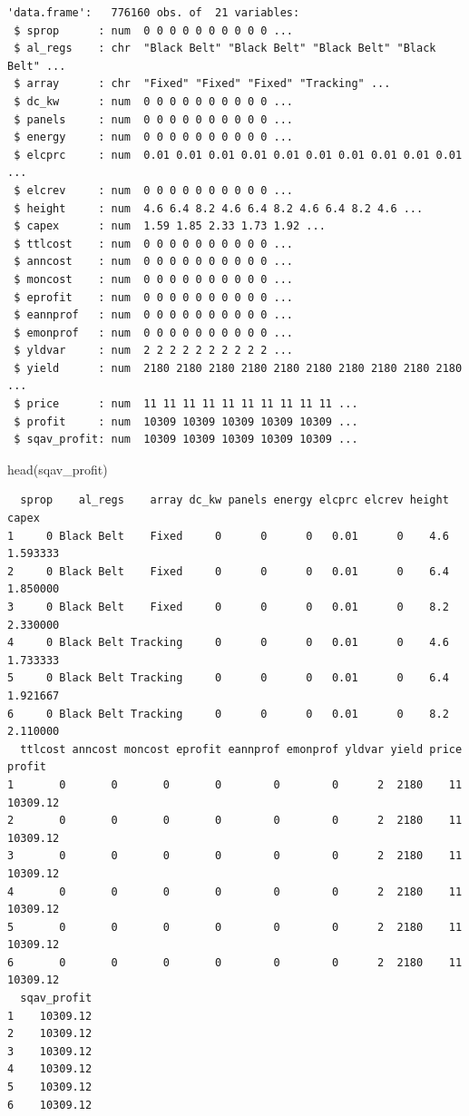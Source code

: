 \documentclass[
  letterpaper,
  DIV=11,
  numbers=noendperiod]{scrartcl}
\newenvironment{Shaded}{\begin{snugshade}}{\end{snugshade}}
\newcommand{\FunctionTok}[1]{\textcolor[rgb]{0.28,0.35,0.67}{#1}}
\newcommand{\NormalTok}[1]{\textcolor[rgb]{0.00,0.23,0.31}{#1}}
\begin{document}
\begin{verbatim}
'data.frame':   776160 obs. of  21 variables:
 $ sprop      : num  0 0 0 0 0 0 0 0 0 0 ...
 $ al_regs    : chr  "Black Belt" "Black Belt" "Black Belt" "Black Belt" ...
 $ array      : chr  "Fixed" "Fixed" "Fixed" "Tracking" ...
 $ dc_kw      : num  0 0 0 0 0 0 0 0 0 0 ...
 $ panels     : num  0 0 0 0 0 0 0 0 0 0 ...
 $ energy     : num  0 0 0 0 0 0 0 0 0 0 ...
 $ elcprc     : num  0.01 0.01 0.01 0.01 0.01 0.01 0.01 0.01 0.01 0.01 ...
 $ elcrev     : num  0 0 0 0 0 0 0 0 0 0 ...
 $ height     : num  4.6 6.4 8.2 4.6 6.4 8.2 4.6 6.4 8.2 4.6 ...
 $ capex      : num  1.59 1.85 2.33 1.73 1.92 ...
 $ ttlcost    : num  0 0 0 0 0 0 0 0 0 0 ...
 $ anncost    : num  0 0 0 0 0 0 0 0 0 0 ...
 $ moncost    : num  0 0 0 0 0 0 0 0 0 0 ...
 $ eprofit    : num  0 0 0 0 0 0 0 0 0 0 ...
 $ eannprof   : num  0 0 0 0 0 0 0 0 0 0 ...
 $ emonprof   : num  0 0 0 0 0 0 0 0 0 0 ...
 $ yldvar     : num  2 2 2 2 2 2 2 2 2 2 ...
 $ yield      : num  2180 2180 2180 2180 2180 2180 2180 2180 2180 2180 ...
 $ price      : num  11 11 11 11 11 11 11 11 11 11 ...
 $ profit     : num  10309 10309 10309 10309 10309 ...
 $ sqav_profit: num  10309 10309 10309 10309 10309 ...
\end{verbatim}

\begin{Shaded}
\begin{Highlighting}[]
\FunctionTok{head}\NormalTok{(sqav\_profit)}
\end{Highlighting}
\end{Shaded}

\begin{verbatim}
  sprop    al_regs    array dc_kw panels energy elcprc elcrev height    capex
1     0 Black Belt    Fixed     0      0      0   0.01      0    4.6 1.593333
2     0 Black Belt    Fixed     0      0      0   0.01      0    6.4 1.850000
3     0 Black Belt    Fixed     0      0      0   0.01      0    8.2 2.330000
4     0 Black Belt Tracking     0      0      0   0.01      0    4.6 1.733333
5     0 Black Belt Tracking     0      0      0   0.01      0    6.4 1.921667
6     0 Black Belt Tracking     0      0      0   0.01      0    8.2 2.110000
  ttlcost anncost moncost eprofit eannprof emonprof yldvar yield price   profit
1       0       0       0       0        0        0      2  2180    11 10309.12
2       0       0       0       0        0        0      2  2180    11 10309.12
3       0       0       0       0        0        0      2  2180    11 10309.12
4       0       0       0       0        0        0      2  2180    11 10309.12
5       0       0       0       0        0        0      2  2180    11 10309.12
6       0       0       0       0        0        0      2  2180    11 10309.12
  sqav_profit
1    10309.12
2    10309.12
3    10309.12
4    10309.12
5    10309.12
6    10309.12
\end{verbatim}
\end{document}
